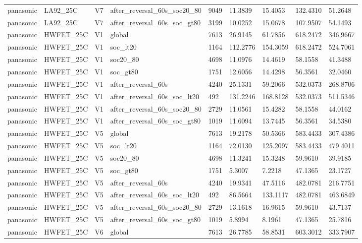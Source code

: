 \begin{tabular}{lllllllll}
panasonic & LA92\_25C & V7 & after\_reversal\_60s\_soc20\_80 & 9049 & 11.3839 & 15.4053 & 132.4310 & 51.2648 \\
panasonic & LA92\_25C & V7 & after\_reversal\_60s\_soc\_gt80 & 3199 & 10.0252 & 15.0678 & 107.9507 & 54.1493 \\
panasonic & HWFET\_25C & V1 & global & 7613 & 26.9145 & 61.7856 & 618.2472 & 346.9667 \\
panasonic & HWFET\_25C & V1 & soc\_lt20 & 1164 & 112.2776 & 154.3059 & 618.2472 & 524.7061 \\
panasonic & HWFET\_25C & V1 & soc20\_80 & 4698 & 11.0976 & 14.4619 & 58.1558 & 41.3488 \\
panasonic & HWFET\_25C & V1 & soc\_gt80 & 1751 & 12.6056 & 14.4298 & 56.3561 & 32.0460 \\
panasonic & HWFET\_25C & V1 & after\_reversal\_60s & 4240 & 25.1331 & 59.2066 & 532.0373 & 268.8706 \\
panasonic & HWFET\_25C & V1 & after\_reversal\_60s\_soc\_lt20 & 492 & 131.2246 & 168.8128 & 532.0373 & 511.5346 \\
panasonic & HWFET\_25C & V1 & after\_reversal\_60s\_soc20\_80 & 2729 & 11.0561 & 15.4282 & 58.1558 & 44.0162 \\
panasonic & HWFET\_25C & V1 & after\_reversal\_60s\_soc\_gt80 & 1019 & 11.6094 & 13.7445 & 56.3561 & 34.5380 \\
panasonic & HWFET\_25C & V5 & global & 7613 & 19.2178 & 50.5366 & 583.4433 & 307.4386 \\
panasonic & HWFET\_25C & V5 & soc\_lt20 & 1164 & 72.0130 & 125.2097 & 583.4433 & 479.4011 \\
panasonic & HWFET\_25C & V5 & soc20\_80 & 4698 & 11.3241 & 15.3248 & 59.9610 & 39.9185 \\
panasonic & HWFET\_25C & V5 & soc\_gt80 & 1751 & 5.3007 & 7.2218 & 47.1365 & 23.1727 \\
panasonic & HWFET\_25C & V5 & after\_reversal\_60s & 4240 & 19.9341 & 47.5116 & 482.0781 & 216.7751 \\
panasonic & HWFET\_25C & V5 & after\_reversal\_60s\_soc\_lt20 & 492 & 86.5664 & 133.1117 & 482.0781 & 463.6849 \\
panasonic & HWFET\_25C & V5 & after\_reversal\_60s\_soc20\_80 & 2729 & 13.1618 & 16.9615 & 59.9610 & 43.7137 \\
panasonic & HWFET\_25C & V5 & after\_reversal\_60s\_soc\_gt80 & 1019 & 5.8994 & 8.1961 & 47.1365 & 25.7816 \\
panasonic & HWFET\_25C & V6 & global & 7613 & 26.7785 & 58.8531 & 603.3012 & 333.7907 \\

\end{tabular}
